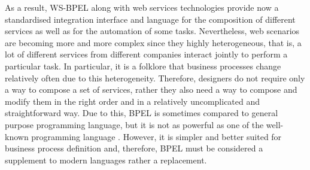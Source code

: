 As a result, WS-BPEL along with web services technologies provide now a standardised integration interface 
and language for the composition of different services as well as for the automation of some tasks. 
Nevertheless, web scenarios are becoming more and more complex since they highly heterogeneous, that is, a lot of different
services from different companies interact jointly to perform a particular task. In particular, it is a folklore 
that business processes change relatively often due to this heterogeneity. Therefore, designers 
do not require only a way to compose a set of services, rather they also
need a way to compose and modify them in the right order and in a relatively 
uncomplicated and straightforward way. Due to this, BPEL is sometimes compared 
to general purpose programming language, but it
is not as powerful as one of the well-known programming language \cite{}. However, 
it is simpler and better suited for business
process definition and, therefore, BPEL must be considered a supplement to
modern languages rather a replacement.




